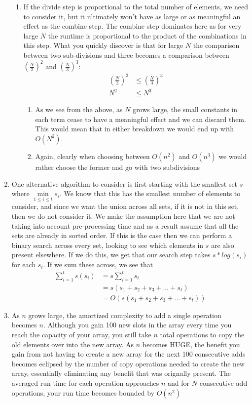 \documentclass[11pt,a4paper]{article}
\begin{document}
\begin{enumerate}
\begin{enumerate}
			\item If the divide step is proportional to the total number of elements, we need to consider it, but it ultimately won't have as large or as meaningful an effect as the combine step. The combine step dominates here as for very large $N$ the runtime is proportional to the product of the combinations in this step. What you quickly discover is that for large $N$ the comparison between two sub-divisions and three becomes a comparison between $(\frac{N}{2})^2$ and $(\frac{N}{3})^3$:
			\begin{align*}
				(\frac{N}{2})^2 &\le (\frac{N}{3})^3 \\
				N^2&\le N^3
			\end{align*}
			\begin{enumerate}
				\item As we see from the above, as $N$ grows large, the small constants in each term cease to have a meaningful effect and we can discard them. This would mean that in either breakdown we would end up with $O(N^2)$.
				\item Again, clearly when choosing between $O(n^2)$ and $O(n^3)$ we would rather choose the former and go with two subdivisions
			\end{enumerate}
		\end{enumerate}
		
		\item One alternative algorithm to consider is first starting with the smallest set $s$ where $\min\limits_{1\leq i \leq t} s_i$. We know that this has the smallest number of elements to consider, and since we want the union across all sets, if it is not in this set, then we do not consider it. We make the assumption here that we are not taking into account pre-processing time and as a result assume that all the sets are already in sorted order. If this is the case then we can perform a binary search across every set, looking to see which elements in $s$ are also present elsewhere. If we do this, we get that our search step takes $s*log(s_i)$ for each $s_i$. If we sum these across, we see that
		\begin{align*}
		\sum_{i=1}^{t} s(s_i) &= s\sum_{i=1}^{t}s_i \\
		&= 	s(s_1 + s_2 + s_3 + \dots + s_t) \\
		&=  O(s(s_1 + s_2 + s_3 + \dots + s_t))
		\end{align*}
		
		\item As $n$ grows large, the amortized complexity to add a single operation becomes $n$. Although you gain 100 new slots in the array every time you reach the capacity of your array, you still take $n$ total operations to copy the old elements over into the new array. As $n$ becomes HUGE, the benefit you gain from not having to create a new array for the next 100 consecutive adds becomes eclipsed by the number of copy operations needed to create the new array, essentially eliminating any benefit that was orignally present. The averaged run time for each operation approaches $n$ and for $N$ consecutive add operations, your run time becomes bounded by $O(n^2)$
	\end{enumerate}
\end{document}
